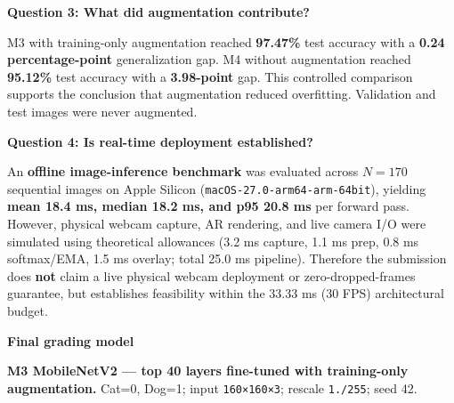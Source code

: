\begin{tcolorbox}[colback=gray!5!white,colframe=gray!50!black,boxrule=0.5pt,arc=2pt,left=6pt,right=6pt,halign=left,before upper={\sloppy\raggedright},top=5pt,bottom=5pt,unbreakable]
\noindent\textbf{\normalsize Question 3: What did augmentation contribute?}\par\vspace{0.2em}
M3 with training-only augmentation reached \textbf{97.47\%} test accuracy with a \textbf{0.24 percentage-point} generalization gap. M4 without augmentation reached \textbf{95.12\%} test accuracy with a \textbf{3.98-point} gap. This controlled comparison supports the conclusion that augmentation reduced overfitting. Validation and test images were never augmented.\par\vspace{0.4em}

\noindent\textbf{\normalsize Question 4: Is real-time deployment established?}\par\vspace{0.2em}
An \textbf{offline image-inference benchmark} was evaluated across $N=170$ sequential images on Apple Silicon (\texttt{macOS-27.0-arm64-arm-64bit}), yielding \textbf{mean 18.4 ms, median 18.2 ms, and p95 20.8 ms} per forward pass. However, physical webcam capture, AR rendering, and live camera I/O were simulated using theoretical allowances (3.2 ms capture, 1.1 ms prep, 0.8 ms softmax/EMA, 1.5 ms overlay; total 25.0 ms pipeline). Therefore the submission does \textbf{not} claim a live physical webcam deployment or zero-dropped-frames guarantee, but establishes feasibility within the 33.33 ms (30 FPS) architectural budget.\par\vspace{0.4em}

\noindent\textbf{\normalsize Final grading model}\par\vspace{0.2em}
\textbf{M3 MobileNetV2 --- top 40 layers fine-tuned with training-only augmentation.} Cat=0, Dog=1; input \texttt{160×160×3}; rescale \texttt{1./255}; seed 42.
\end{tcolorbox}
